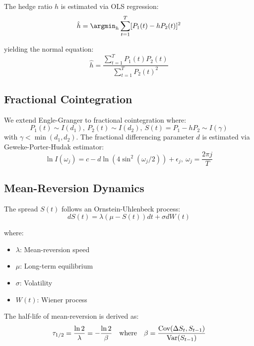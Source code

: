 \documentclass[article]{arithmaxresearch}
\begin{document}
The hedge ratio $h$ is estimated via OLS regression:
\begin{equation}
\hat{h} = \argmin_h \sum_{t=1}^T [P_1(t) - hP_2(t)]^2
\end{equation}

yielding the normal equation:
\begin{equation}
\hat{h} = \frac{\sum_{t=1}^T P_1(t)P_2(t)}{\sum_{t=1}^T P_2(t)^2}
\end{equation}

\subsection{Fractional Cointegration}
We extend Engle-Granger to fractional cointegration where:
\begin{equation}
P_1(t) \sim I(d_1), \ P_2(t) \sim I(d_2), \ S(t) = P_1 - hP_2 \sim I(\gamma)
\end{equation}
with $\gamma < \min(d_1,d_2)$. The fractional differencing parameter $d$ is estimated via Geweke-Porter-Hudak estimator:
\begin{equation}
\ln I(\omega_j) = c - d\ln\left(4\sin^2(\omega_j/2)\right) + \epsilon_j, \ \omega_j = \frac{2\pi j}{T}
\end{equation}

\subsection{Mean-Reversion Dynamics}

The spread $S(t)$ follows an Ornstein-Uhlenbeck process:
\begin{equation}
dS(t) = \lambda(\mu - S(t))dt + \sigma dW(t)
\end{equation}

where:
\begin{itemize}
    \item $\lambda$: Mean-reversion speed
    \item $\mu$: Long-term equilibrium
    \item $\sigma$: Volatility
    \item $W(t)$: Wiener process
\end{itemize}

The half-life of mean-reversion is derived as:
\begin{equation}
\tau_{1/2} = \frac{\ln 2}{\lambda} = -\frac{\ln 2}{\beta} \quad \text{where} \quad \beta = \frac{\text{Cov}(\Delta S_t, S_{t-1})}{\text{Var}(S_{t-1})}
\end{equation}
\end{document}
